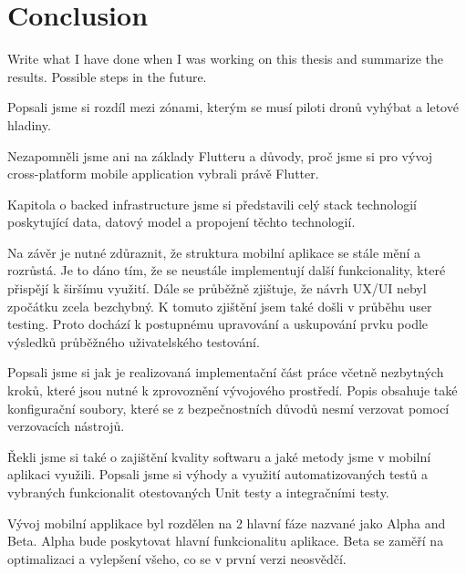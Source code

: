 \chapter{Conclusion}\label{ch:conclusion}
Write what I have done when I was working on this thesis and summarize the results.
Possible steps in the future.

Popsali jsme si rozdíl mezi zónami, kterým se musí piloti dronů vyhýbat a letové hladiny.

Nezapomněli jsme ani na základy Flutteru a důvody, proč jsme si pro vývoj cross-platform mobile application vybrali právě Flutter.


Kapitola o backed infrastructure jsme si představili celý stack technologií poskytující data, datový model a propojení těchto technologií.

Na závěr je nutné zdůraznit, že struktura mobilní aplikace se stále mění a rozrůstá.
Je to dáno tím, že se neustále implementují další funkcionality, které přispějí k širšímu využití.
Dále se průběžně zjištuje, že návrh UX/UI nebyl zpočátku zcela bezchybný.
K tomuto zjištění jsem také došli v průběhu user testing.
Proto dochází k postupnému upravování a uskupování prvku podle výsledků průběžného uživatelského testování.

Popsali jsme si jak je realizovaná implementační část práce včetně nezbytných kroků, které jsou nutné k zprovoznění vývojového prostředí.
Popis obsahuje také konfigurační soubory, které se z bezpečnostních důvodů nesmí verzovat pomocí verzovacích nástrojů.

Řekli jsme si také o zajištění kvality softwaru a jaké metody jsme v mobilní aplikaci využili.
Popsali jsme si výhody a využití automatizovaných testů a vybraných funkcionalit otestovaných Unit testy a integračními testy.

Vývoj mobilní applikace byl rozdělen na 2 hlavní fáze nazvané jako Alpha and Beta.
Alpha bude poskytovat hlavní funkcionalitu aplikace.
Beta se zaměří na optimalizaci a vylepšení všeho, co se v první verzi neosvědčí.
